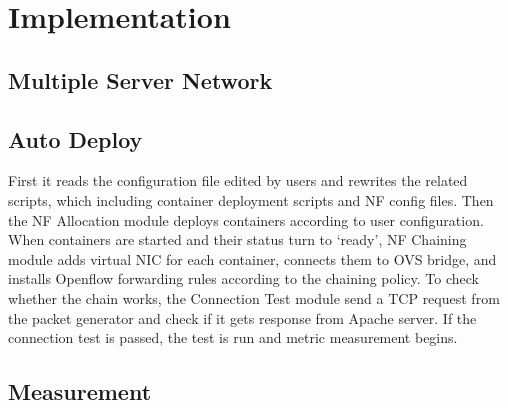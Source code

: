 \section{Implementation}
\subsection{Multiple Server Network}


\subsection{Auto Deploy}
First it reads the configuration file edited by users and rewrites the related scripts,
which including container deployment scripts and NF config files.
Then the NF Allocation module deploys containers according to user configuration.
When containers are started and their status turn to `ready',
NF Chaining module adds virtual NIC for each container,
connects them to OVS bridge,
and installs Openflow forwarding rules according to the chaining policy.
To check whether the chain works,
the Connection Test module send a TCP request
from the packet generator and check if it gets response from Apache server.
If the connection test is passed,
the test is run and metric measurement begins.
\subsection{Measurement}

